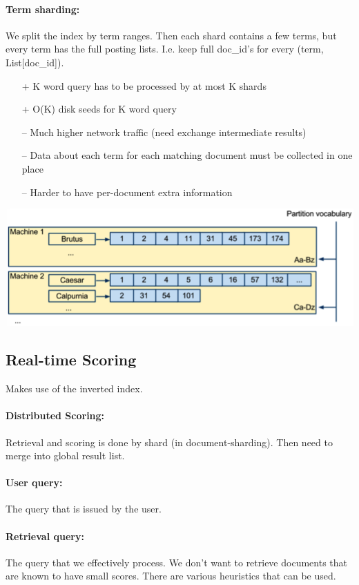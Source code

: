 \documentclass[a4paper,11pt]{article}
\begin{document}
\begin{multicols}{2}
\paragraph{Term sharding:} We split the index by term ranges. Then each shard contains a few terms, but every term has the full posting lists. I.e. keep full doc\_id's for every (term, List[doc\_id]).
\begin{itemize}
  \item[+] K word query has to be processed by at most K shards
  \item[+] O(K) disk seeds for K word query
  \item[--] Much higher network traffic (need exchange intermediate results)
  \item[--] Data about each term for each matching document must be collected in one place
  \item[--] Harder to have per-document extra information
\end{itemize}
\begin{center}
  \includegraphics[width=0.9\columnwidth]{term-shard.png}
\end{center}

\subsection{Real-time Scoring}
Makes use of the inverted index.
\paragraph{Distributed Scoring:} Retrieval and scoring is done by shard (in document-sharding). Then need to merge into global result list.

\paragraph{User query:} The query that is issued by the user.
\paragraph{Retrieval query:} The query that we effectively process. We don't want to retrieve documents that are known to have small scores. There are various heuristics that can be used.


\end{multicols}
\end{document}

